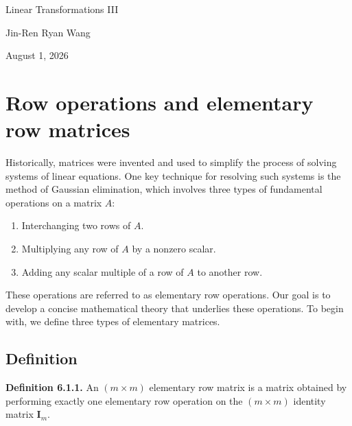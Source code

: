 \documentclass[12pt]{article}
\begin{document}
\begin{titlepage}
    \centering

    \vspace*{\fill}

    {\Huge Linear Transformations III}

    \vspace{1cm}

    {\Large Jin-Ren Ryan Wang\par}

    \vspace{0.5cm}

    {\large August 1, 2026\par}

    \vspace*{\fill}
\end{titlepage}

\tableofcontents

\newpage

\section{Row operations and elementary row matrices}

Historically, matrices were invented and used to simplify the process of
solving systems of linear equations. One key technique for resolving such
systems is the method of Gaussian elimination, which involves three types of
fundamental operations on a matrix $A$:

\begin{enumerate}
    \item[(I)] Interchanging two rows of $A$.
    \item[(II)] Multiplying any row of $A$ by a nonzero scalar.
    \item[(III)] Adding any scalar multiple of a row of $A$ to another row.
\end{enumerate}

These operations are referred to as elementary row operations. Our goal is to
develop a concise mathematical theory that underlies these operations. To
begin with, we define three types of elementary matrices.
\subsection{Definition}

\textbf{Definition 6.1.1.}
An $(m \times m)$ elementary row matrix is a matrix obtained by
performing exactly one elementary row operation on the
$(m \times m)$ identity matrix $\mathbf{I}_m$.
\end{document}
